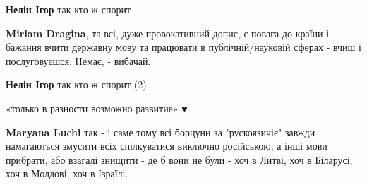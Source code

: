 \begin{itemize}
\begin{itemize}
 
\textbf{Нелін Ігор} так кто ж спорит

 
\textbf{Miriam Dragina}, та всі, дуже провокативний допис, є повага до країни і бажання вчити державну мову та працювати в публічній/науковій сферах - вчиш і послуговуєшся. Немає, - вибачай.

 
\textbf{Нелін Ігор} так кто ж спорит (2)
\end{itemize}

 
«только в разности возможно развитие» ♥️

\begin{itemize}
 
\textbf{Maryana Luchi} так - і саме тому всі борцуни за "рускоязичіє" завжди намагаються змусити всіх спілкуватися виключно російською, а інші мови прибрати, або взагалі знищити - де б вони не були - хоч в Литві, хоч в Біларусі, хоч в Молдові, хоч в Ізраїлі.
\end{itemize}

 


\end{itemize}
